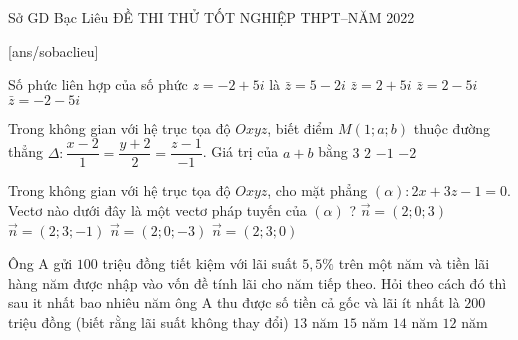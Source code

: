 \begin{name}
{Sở GD Bạc Liêu}
{ĐỀ THI THỬ TỐT NGHIỆP THPT--NĂM 2022 }
\end{name}
[ans/sobaclieu]
\begin{ex} 
 Số phức liên hợp của số phức $z=-2+5 i$ là
\choice
{$\bar{z}=5-2 i$}
{$\bar{z}=2+5 i$}
{$\bar{z}=2-5 i$}
{\True $\bar{z}=-2-5 i$}
\end{ex}

\begin{ex} %
 Trong không gian với hệ trục tọa độ $O x y z$, biết điểm $M(1; a; b)$ thuộc đường thẳng $\Delta: \dfrac{x-2}{1}=\dfrac{y+2}{2}=\dfrac{z-1}{-1}$. Giá trị của $a+b$ bằng
\choice
{$3$}
{$2$}
{$-1$}
{\True $-2$}
\end{ex}

\begin{ex} %
 Trong không gian với hệ trục tọa độ $O x y z$, cho mặt phẳng $(\alpha): 2 x+3 z-1=0$. Vectơ nào dưới đây là một vectơ pháp tuyến của $(\alpha)$ ?
\choice
{\True$\vec{n}=(2; 0; 3)$}
{$\vec{n}=(2; 3;-1)$}
{$\vec{n}=(2; 0;-3)$}
{$\vec{n}=(2; 3; 0)$}
\end{ex}

\begin{ex} %
 Ông A gửi $100$ triệu đồng tiết kiệm với lãi suất $5,5 \%$ trên một năm và tiền lãi hàng năm được nhập vào vốn đề tính lãi cho năm tiếp theo. Hỏi theo cách đó thì sau it nhất bao nhiêu năm ông A thu được số tiền cả gốc và lãi ít nhất là $200$ triệu đồng (biết rằng lãi suất không thay đổi)
\choice
{$13$ năm}
{\True $15$ năm}
{$14$ năm}
{$12$ năm}
\end{ex}

\begin{ex} %
{}
\end{ex}

